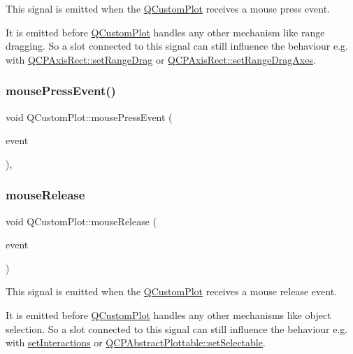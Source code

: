 This signal is emitted when the \mbox{\hyperlink{class_q_custom_plot}{Q\+Custom\+Plot}} receives a mouse press event.

It is emitted before \mbox{\hyperlink{class_q_custom_plot}{Q\+Custom\+Plot}} handles any other mechanism like range dragging. So a slot connected to this signal can still influence the behaviour e.\+g. with \mbox{\hyperlink{class_q_c_p_axis_rect_ae6aef2f7211ba6097c925dcd26008418}{Q\+C\+P\+Axis\+Rect\+::set\+Range\+Drag}} or \mbox{\hyperlink{class_q_c_p_axis_rect_a648cce336bd99daac4a5ca3e5743775d}{Q\+C\+P\+Axis\+Rect\+::set\+Range\+Drag\+Axes}}. \mbox{\label{class_q_custom_plot_aac0a7296a6031dc667c01c1abd4ecc6b}} 
\subsubsection{\texorpdfstring{mousePressEvent()}{mousePressEvent()}}
{\footnotesize\ttfamily void Q\+Custom\+Plot\+::mouse\+Press\+Event (\begin{DoxyParamCaption}\item[{Q\+Mouse\+Event $\ast$}]{event }\end{DoxyParamCaption})\hspace{0.3cm}{\ttfamily [protected]}, {\ttfamily [virtual]}}

\mbox{\label{class_q_custom_plot_ac8dc0ee6bb98e923c00b4ebafbe6134d}} 
\subsubsection{\texorpdfstring{mouseRelease}{mouseRelease}}
{\footnotesize\ttfamily void Q\+Custom\+Plot\+::mouse\+Release (\begin{DoxyParamCaption}\item[{Q\+Mouse\+Event $\ast$}]{event }\end{DoxyParamCaption})\hspace{0.3cm}{\ttfamily [signal]}}

This signal is emitted when the \mbox{\hyperlink{class_q_custom_plot}{Q\+Custom\+Plot}} receives a mouse release event.

It is emitted before \mbox{\hyperlink{class_q_custom_plot}{Q\+Custom\+Plot}} handles any other mechanisms like object selection. So a slot connected to this signal can still influence the behaviour e.\+g. with \mbox{\hyperlink{class_q_custom_plot_a5ee1e2f6ae27419deca53e75907c27e5}{set\+Interactions}} or \mbox{\hyperlink{class_q_c_p_abstract_plottable_ac238d6e910f976f1f30d41c2bca44ac3}{Q\+C\+P\+Abstract\+Plottable\+::set\+Selectable}}. \mbox{\label{class_q_custom_plot_adc24846f52199e5a9bc35c387a6ce68d}} 
